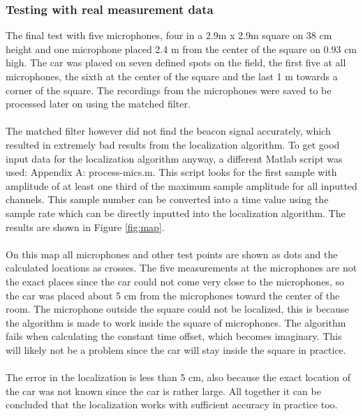 \documentclass[final]{scrreprt} %
\begin{document}
\subsubsection{Testing with real measurement data}
The final test with five microphones, four in a 2.9m x 2.9m square on 38 cm height and one microphone placed 2.4 m from the center of the square on 0.93 cm high.
The car was placed on seven defined spots on the field, the first five at all microphones, the sixth at the center of the square and the last 1 m towards a corner of the square.
The recordings from the microphones were saved to be processed later on using the matched filter.
\\ \\
The matched filter however did not find the beacon signal accurately, which resulted in extremely bad results from the localization algorithm.
To get good input data for the localization algorithm anyway, a different Matlab script was used: Appendix A: process-mics.m.
This script looks for the first sample with amplitude of at least one third of the maximum sample amplitude for all inputted channels.
This sample number can be converted into a time value using the sample rate which can be directly inputted into the localization algorithm.
The results are shown in Figure \ref{fig:map}.
\\ \\
On this map all microphones and other test points are shown as dots and the calculated locations as crosses.
The five measurements at the microphones are not the exact places since the car could not come very close to the microphones, so the car was placed about 5 cm from the microphones toward the center of the room.
The microphone outside the square could not be localized, this is because the algorithm is made to work inside the square of microphones.
The algorithm fails when calculating the constant time offset, which becomes imaginary.
This will likely not be a problem since the car will stay inside the square in practice.
\\ \\
The error in the localization is less than 5 cm, also because the exact location of the car was not known since the car is rather large.
All together it can be concluded that the localization works with sufficient accuracy in practice too.
\end{document}
